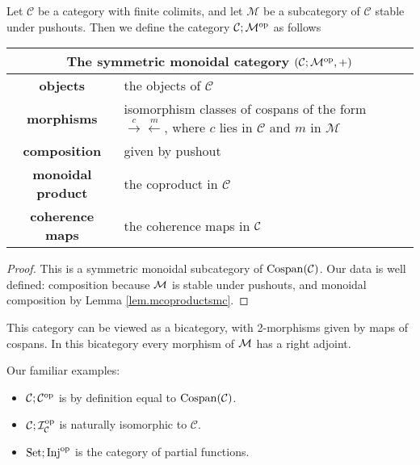 \begin{proposition}
  Let $\mathcal C$ be a category with finite colimits, and let $\mathcal M$ be a
  subcategory of $\mathcal C$ stable under pushouts. Then we define the category
  $\mathcal C; \mathcal M^{\mathrm{op}}$ as follows  
  \smallskip 

  \begin{center}
    \begin{tabular}{| c | p{} |}
      \hline
      \multicolumn{2}{|c|}{The symmetric monoidal category $(\mathcal C;\mathcal M^{\mathrm{op}},+)$} \\
      \hline
      \textbf{objects} & the objects of $\mathcal C$ \\ 
      \textbf{morphisms} & isomorphism classes of cospans of the form
      $\stackrel{c}\rightarrow \stackrel{m}\leftarrow$, where $c$ lies in
      $\mathcal C$ and $m$ in $\mathcal M$\\ 
      \textbf{composition} & given by pushout \\
      \textbf{monoidal product} & the coproduct in $\mathcal C$ \\
      \textbf{coherence maps} & the coherence maps in $\mathcal C$ \\
      \hline
    \end{tabular}
  \end{center}
  \smallskip 
\end{proposition}

\begin{proof}
  This is a symmetric monoidal subcategory of $\operatorname{{Cospan}}(\mathcal C)$. Our data is
  well defined: composition because $\mathcal M$ is stable under pushouts, and
  monoidal composition by Lemma \ref{lem.mcoproductsmc}. 
\end{proof}

This category can be viewed as a bicategory, with 2-morphisms given by maps of
cospans. In this bicategory every morphism of $\mathcal M$ has a right adjoint.

\begin{examples} 
  Our familiar examples:
  \begin{itemize}
    \item $\mathcal C; \mathcal C^{\mathrm{op}}$ is by definition equal to
$\operatorname{{Cospan}}(\mathcal C)$.
\item $\mathcal C;\mathcal I_{\mathcal C}^{\mathrm{op}}$ is
naturally isomorphic to $\mathcal C$.
\item $\mathrm{Set};\mathrm{Inj}^{\mathrm{op}}$ is the category of partial functions.
\end{itemize}
\end{examples}

